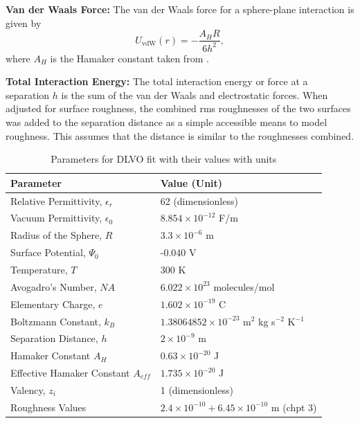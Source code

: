 \textbf{Van der Waals Force:} The van der Waals force for a sphere-plane interaction is given by
    \[
    U_{\text{vdW}}(r) = -\frac{A_H R}{6 h^2},
    \]
    where $A_H$ is the Hamaker constant taken from \cite{Bergstrom1997}.
    
\textbf{Total Interaction Energy:} The total interaction energy or force at a separation $h$ is the sum of the van der Waals and electrostatic forces. When adjusted for surface roughness, the combined rms roughnesses of the two surfaces was added to the separation distance as a simple accessible means to model roughness. This assumes that the distance is similar to the roughnesses combined. 

\begin{table}[h]
\centering
\begin{tabular}{|l|l|}
\hline
\textbf{Parameter} & \textbf{Value (Unit)} \\ \hline
Relative Permittivity, $\epsilon_r$ & 62 (dimensionless) \cite{behrends2006dielectric} \\ \hline
Vacuum Permittivity, $\epsilon_0$ & $8.854 \times 10^{-12}$ F/m \\ \hline
Radius of the Sphere, $R$ & $3.3 \times 10^{-6}$ m \\ \hline
Surface Potential, $\Psi_0$ & -0.040 V \cite{silica2021}\\ \hline
Temperature, $T$ & 300 K \\ \hline
Avogadro's Number, $NA$ & $6.022 \times 10^{23}$ molecules/mol \\ \hline
Elementary Charge, $e$ & $1.602 \times 10^{-19}$ C \\ \hline
Boltzmann Constant, $k_B$ & $1.38064852 \times 10^{-23}$ m\(^2\) kg s\(^{-2}\) K\(^{-1}\) \\ \hline
Separation Distance, $h$ & $2 \times 10^{-9}$ m \\ \hline
Hamaker Constant $A_H$ & $0.63 \times 10^{-20}$ J \cite{Bergstrom1997}\\ \hline
Effective Hamaker Constant $A_{eff}$ & $1.735 \times 10^{-20}$ J\\ \hline
Valency, $z_i$ & 1 (dimensionless) \\ \hline
Roughness Values & $2.4 \times 10^{-10} + 6.45 \times 10^{-10}$ m (chpt 3) \\ \hline
\end{tabular}
\caption{Parameters for DLVO fit with their values with units}
\label{table:parameters_units}
\end{table}



